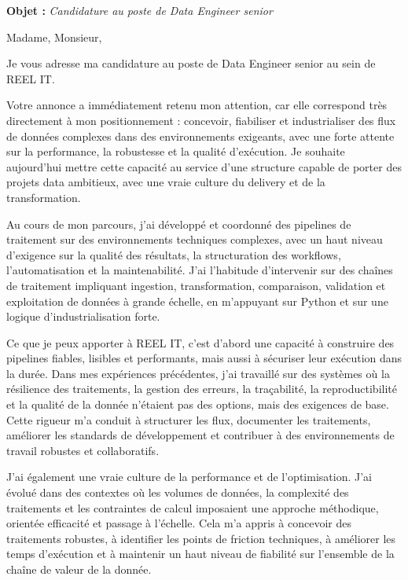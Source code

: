 \documentclass[11pt,a4paper]{altacv}
\begin{document}
\makecvheader
\vspace{-0.6cm}
\vspace{-0.4cm}

{\color{accent}\textbf{Objet :}} \textit{Candidature au poste de Data Engineer senior}

{\color{body}

Madame, Monsieur,

Je vous adresse ma candidature au poste de Data Engineer senior au sein de REEL IT.

Votre annonce a immédiatement retenu mon attention, car elle correspond très directement à mon positionnement : concevoir, fiabiliser et industrialiser des flux de données complexes dans des environnements exigeants, avec une forte attente sur la performance, la robustesse et la qualité d’exécution. Je souhaite aujourd’hui mettre cette capacité au service d’une structure capable de porter des projets data ambitieux, avec une vraie culture du delivery et de la transformation.

Au cours de mon parcours, j’ai développé et coordonné des pipelines de traitement sur des environnements techniques complexes, avec un haut niveau d’exigence sur la qualité des résultats, la structuration des workflows, l’automatisation et la maintenabilité. J’ai l’habitude d’intervenir sur des chaînes de traitement impliquant ingestion, transformation, comparaison, validation et exploitation de données à grande échelle, en m’appuyant sur Python et sur une logique d’industrialisation forte.

Ce que je peux apporter à REEL IT, c’est d’abord une capacité à construire des pipelines fiables, lisibles et performants, mais aussi à sécuriser leur exécution dans la durée. Dans mes expériences précédentes, j’ai travaillé sur des systèmes où la résilience des traitements, la gestion des erreurs, la traçabilité, la reproductibilité et la qualité de la donnée n’étaient pas des options, mais des exigences de base. Cette rigueur m’a conduit à structurer les flux, documenter les traitements, améliorer les standards de développement et contribuer à des environnements de travail robustes et collaboratifs.

J’ai également une vraie culture de la performance et de l’optimisation. J’ai évolué dans des contextes où les volumes de données, la complexité des traitements et les contraintes de calcul imposaient une approche méthodique, orientée efficacité et passage à l’échelle. Cela m’a appris à concevoir des traitements robustes, à identifier les points de friction techniques, à améliorer les temps d’exécution et à maintenir un haut niveau de fiabilité sur l’ensemble de la chaîne de valeur de la donnée.

}
\end{document}

